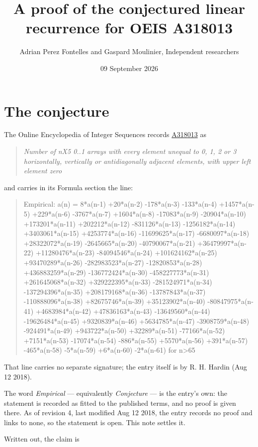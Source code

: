 \documentclass[11pt]{article}
\title{A proof of the conjectured linear recurrence for OEIS A318013}
\author{Adrian Perez Fontelles and Gaspard Moulinier, Independent researchers}
\date{09 September 2026}
\theoremstyle{definition}
\begin{document}
\maketitle
\section{The conjecture}

The Online Encyclopedia of Integer Sequences records \href{https://oeis.org/A318013}{A318013} as

\begin{quote}\itshape Number of nX5 0..1 arrays with every element unequal to 0, 1, 2 or 3 horizontally, vertically or antidiagonally adjacent elements, with upper left element zero\end{quote}

and carries in its Formula section the line:

\begin{quote}\ttfamily Empirical: a(n) = 8*a(n-1) +20*a(n-2) -178*a(n-3) -133*a(n-4) +1457*a(n-5) +229*a(n-6) -3767*a(n-7) +1604*a(n-8) -17083*a(n-9) -20904*a(n-10) +173201*a(n-11) +202212*a(n-12) -831126*a(n-13) -1256182*a(n-14) +3403061*a(n-15) +4253774*a(n-16) -11699625*a(n-17) -6680097*a(n-18) +28322072*a(n-19) -2645665*a(n-20) -40790067*a(n-21) +36479997*a(n-22) +11280476*a(n-23) -84094546*a(n-24) +101624162*a(n-25) +93470289*a(n-26) -282983523*a(n-27) -12820853*a(n-28) +436883259*a(n-29) -136772424*a(n-30) -458227773*a(n-31) +261645068*a(n-32) +329222395*a(n-33) -281524971*a(n-34) -137294396*a(n-35) +208179168*a(n-36) -13787843*a(n-37) -110888096*a(n-38) +82675746*a(n-39) +35123902*a(n-40) -80847975*a(n-41) +4683984*a(n-42) +47836163*a(n-43) -13649560*a(n-44) -19626484*a(n-45) +9320839*a(n-46) +5634785*a(n-47) -3908759*a(n-48) -924491*a(n-49) +943722*a(n-50) +32289*a(n-51) -77166*a(n-52) +7151*a(n-53) -17074*a(n-54) -886*a(n-55) +5570*a(n-56) +391*a(n-57) -465*a(n-58) -5*a(n-59) +6*a(n-60) -2*a(n-61) for n>65\end{quote}

That line carries no separate signature; the entry itself is by R. H. Hardin (Aug 12 2018).

The word {\itshape Empirical} --- equivalently {\itshape Conjecture} --- is the entry's own: the statement is recorded as fitted to the published terms, and no proof is given there. As of revision 4, last modified Aug 12 2018, the entry records no proof and links to none, so the statement is open. This note settles it.

Written out, the claim is
\end{document}
